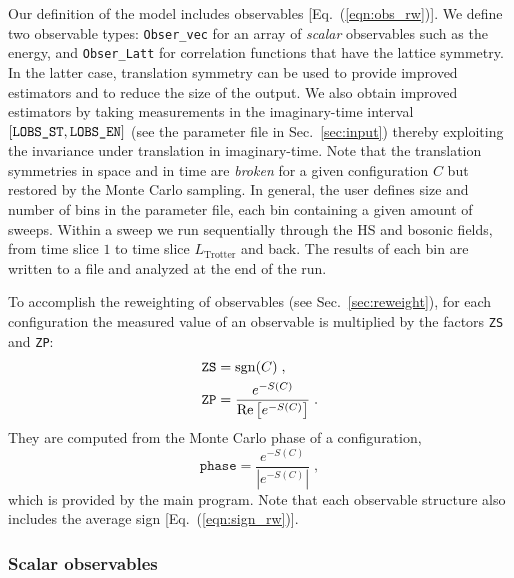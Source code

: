 Our definition  of the model includes observables [Eq.~(\ref{eqn:obs_rw})]. We define two observable types: \texttt{Obser\_vec}  for an array of \emph{scalar} observables
such as the energy, and  \texttt{Obser\_Latt}   for correlation functions that have the lattice symmetry. In the latter case, translation symmetry can be used to provide improved estimators and to reduce the size of the output.   
We also obtain improved estimators by taking measurements in the imaginary-time interval $[\texttt{LOBS\_ST},\texttt{LOBS\_EN\texttt{}}]$ (see the parameter file in Sec.~\ref{sec:input}) thereby exploiting the invariance under translation in imaginary-time.
Note that the translation symmetries  in space and in time are \emph{broken} for a given  configuration $C$ but restored by the Monte Carlo sampling. 
In general, the user defines size and number of bins in the parameter file, each bin containing a given amount of sweeps. Within a sweep we run sequentially through the HS and bosonic fields, from time slice $1$ to time slice $L_{\text{Trotter}}$ and back.  The results of each bin are written to a file  and analyzed at the end of the run.     

To accomplish the reweighting of observables (see Sec.~\ref{sec:reweight}), for each configuration the measured value of an observable is multiplied by the factors \texttt{ZS} and \texttt{ZP}:
\begin{align}
\texttt{ZS} &= \operatorname{sgn}(C)\;, \\
\texttt{ZP} &= \frac{e^{-S(C)}} {\operatorname{Re} \left[e^{-S(C)} \right]}\;.
\end{align}
They are computed from the Monte Carlo phase of a configuration,
\begin{equation}\label{eqn:phase}
	\texttt{phase}   =   \frac{e^{-S(C)}}{ \left| e^{-S(C) }\right| }\;,
\end{equation}
which is provided by the main program.
Note that each observable structure also includes the average sign [Eq.~(\ref{eqn:sign_rw})].

\subsubsection{Scalar observables}

